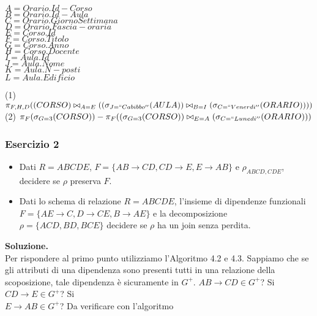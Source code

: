   \begin{multicols}{3}
  \begin{flushleft}
   $A = Orario.Id-Corso$\\
   $B = Orario.Id-Aula$\\
   $C = Orario.GiornoSettimana$\\
   $D = Orario.Fascia-oraria$\\
   $E = Corso.Id$\\
   $F = Corso.Titolo$\\
   $G = Corso.Anno$\\
   $H = Corso.Docente$\\
   $I = Aula.Id$\\
   $J = Aula.Nome$\\
   $K = Aula.N-posti$\\
   $L = Aula.Edificio$\\
  \end{flushleft}
  \end{multicols}

 \noindent(1) $\pi_{F, H, D}((CORSO)\bowtie_{A=E}((\sigma_{J=``Cabibbo''}(AULA))\bowtie_{B=I}(\sigma_{C=``Venerdi''}(ORARIO))))$\\
 (2) $\pi_{F}(\sigma_{G=3}(CORSO)) -\pi_{F}((\sigma_{G=3}(CORSO))\bowtie_{E=A}(\sigma_{C=``Lunedi''}(ORARIO)))$\\

  \subsubsection{Esercizio 2}
 
 \begin{itemize}
  \item Dati $R=ABCDE$, $F=\{AB\rightarrow CD, CD\rightarrow E, E\rightarrow AB\}$ e $\rho_{ABCD, CDE}$, decidere se $\rho$
  preserva $F$.
  \item Dati lo schema di relazione $R=ABCDE$, l'insieme di dipendenze funzionali $F=\{AE\rightarrow C, D\rightarrow CE, B\rightarrow AE\}$
  e la decomposizione $\rho =\{ACD, BD, BCE\}$ decidere se $\rho$ ha un join senza perdita. 
 \end{itemize}
 
 \noindent\textbf{\fontsize{14pt}{1em}Soluzione.}\\
 Per rispondere al primo punto utilizziamo l'Algoritmo 4.2 e 4.3. Sappiamo che se gli attributi di una dipendenza sono presenti
 tutti in una relazione della scoposizione, tale dipendenza è sicuramente in $G^+$.
 $AB\rightarrow CD \in G^+$? Si\\
 $CD\rightarrow E \in G^+$? Si\\
 $E\rightarrow AB \in G^+$? Da verificare con l'algoritmo\\
 
